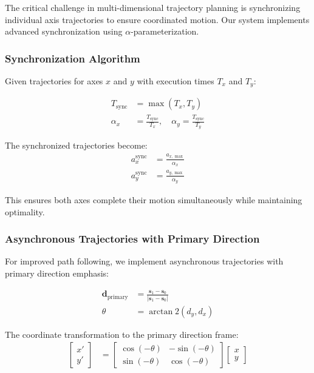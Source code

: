 \documentclass[12pt,a4paper]{article}
\begin{document}
The critical challenge in multi-dimensional trajectory planning is synchronizing individual axis trajectories to ensure coordinated motion. Our system implements advanced synchronization using $\alpha$-parameterization.

\subsubsection{Synchronization Algorithm}

Given trajectories for axes $x$ and $y$ with execution times $T_x$ and $T_y$:

\begin{align}
T_{\text{sync}} &= \max(T_x, T_y) \\
\alpha_x &= \frac{T_{\text{sync}}}{T_x}, \quad \alpha_y = \frac{T_{\text{sync}}}{T_y}
\end{align}

The synchronized trajectories become:
\begin{align}
a_x^{\text{sync}} &= \frac{a_{x,\max}}{\alpha_x} \\
a_y^{\text{sync}} &= \frac{a_{y,\max}}{\alpha_y}
\end{align}

This ensures both axes complete their motion simultaneously while maintaining optimality.

\subsubsection{Asynchronous Trajectories with Primary Direction}

For improved path following, we implement asynchronous trajectories with primary direction emphasis:

\begin{align}
\mathbf{d}_{\text{primary}} &= \frac{\mathbf{s}_1 - \mathbf{s}_0}{|\mathbf{s}_1 - \mathbf{s}_0|} \\
\theta &= \arctan2(d_y, d_x)
\end{align}

The coordinate transformation to the primary direction frame:
\begin{align}
\begin{bmatrix} x' \\ y' \end{bmatrix} &= \begin{bmatrix} \cos(-\theta) & -\sin(-\theta) \\ \sin(-\theta) & \cos(-\theta) \end{bmatrix} \begin{bmatrix} x \\ y \end{bmatrix}
\end{align}
\end{document}
